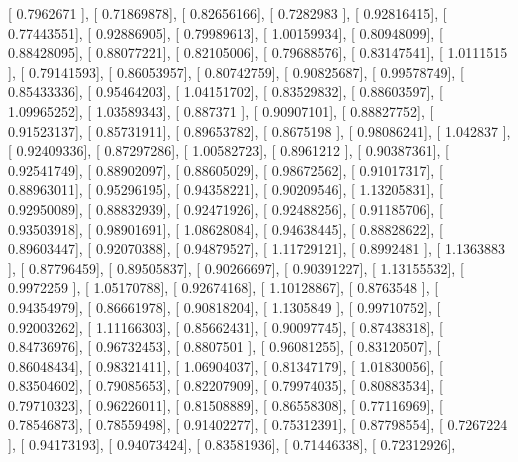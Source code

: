 \documentclass{article}
\begin{document}
       [ 0.7962671 ],
       [ 0.71869878],
       [ 0.82656166],
       [ 0.7282983 ],
       [ 0.92816415],
       [ 0.77443551],
       [ 0.92886905],
       [ 0.79989613],
       [ 1.00159934],
       [ 0.80948099],
       [ 0.88428095],
       [ 0.88077221],
       [ 0.82105006],
       [ 0.79688576],
       [ 0.83147541],
       [ 1.0111515 ],
       [ 0.79141593],
       [ 0.86053957],
       [ 0.80742759],
       [ 0.90825687],
       [ 0.99578749],
       [ 0.85433336],
       [ 0.95464203],
       [ 1.04151702],
       [ 0.83529832],
       [ 0.88603597],
       [ 1.09965252],
       [ 1.03589343],
       [ 0.887371  ],
       [ 0.90907101],
       [ 0.88827752],
       [ 0.91523137],
       [ 0.85731911],
       [ 0.89653782],
       [ 0.8675198 ],
       [ 0.98086241],
       [ 1.042837  ],
       [ 0.92409336],
       [ 0.87297286],
       [ 1.00582723],
       [ 0.8961212 ],
       [ 0.90387361],
       [ 0.92541749],
       [ 0.88902097],
       [ 0.88605029],
       [ 0.98672562],
       [ 0.91017317],
       [ 0.88963011],
       [ 0.95296195],
       [ 0.94358221],
       [ 0.90209546],
       [ 1.13205831],
       [ 0.92950089],
       [ 0.88832939],
       [ 0.92471926],
       [ 0.92488256],
       [ 0.91185706],
       [ 0.93503918],
       [ 0.98901691],
       [ 1.08628084],
       [ 0.94638445],
       [ 0.88828622],
       [ 0.89603447],
       [ 0.92070388],
       [ 0.94879527],
       [ 1.11729121],
       [ 0.8992481 ],
       [ 1.1363883 ],
       [ 0.87796459],
       [ 0.89505837],
       [ 0.90266697],
       [ 0.90391227],
       [ 1.13155532],
       [ 0.9972259 ],
       [ 1.05170788],
       [ 0.92674168],
       [ 1.10128867],
       [ 0.8763548 ],
       [ 0.94354979],
       [ 0.86661978],
       [ 0.90818204],
       [ 1.1305849 ],
       [ 0.99710752],
       [ 0.92003262],
       [ 1.11166303],
       [ 0.85662431],
       [ 0.90097745],
       [ 0.87438318],
       [ 0.84736976],
       [ 0.96732453],
       [ 0.8807501 ],
       [ 0.96081255],
       [ 0.83120507],
       [ 0.86048434],
       [ 0.98321411],
       [ 1.06904037],
       [ 0.81347179],
       [ 1.01830056],
       [ 0.83504602],
       [ 0.79085653],
       [ 0.82207909],
       [ 0.79974035],
       [ 0.80883534],
       [ 0.79710323],
       [ 0.96226011],
       [ 0.81508889],
       [ 0.86558308],
       [ 0.77116969],
       [ 0.78546873],
       [ 0.78559498],
       [ 0.91402277],
       [ 0.75312391],
       [ 0.87798554],
       [ 0.7267224 ],
       [ 0.94173193],
       [ 0.94073424],
       [ 0.83581936],
       [ 0.71446338],
       [ 0.72312926],
\end{document}
